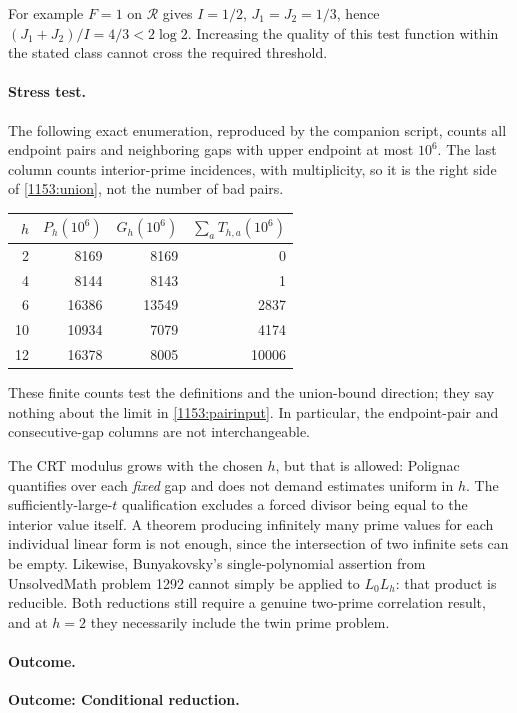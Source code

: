 \documentclass[11pt,a4paper]{article}
\numberwithin{equation}{section}
\begin{document}
For example $F=1$ on $\mathcal R$ gives $I=1/2$, $J_1=J_2=1/3$, hence
$(J_1+J_2)/I=4/3<2\log2$. Increasing the quality of this test function within
the stated class cannot cross the required threshold.

\paragraph{Stress test.}
The following exact enumeration, reproduced by the companion script, counts
all endpoint pairs and neighboring gaps with upper endpoint at most
$10^6$. The last column counts interior-prime incidences, with multiplicity,
so it is the right side of \eqref{1153:union}, not the number of bad pairs.
\begin{center}
\begin{tabular}{r|r|r|r}
$h$ & $P_h(10^6)$ & $G_h(10^6)$ & $\sum_a T_{h,a}(10^6)$\\\hline
2 & 8169 & 8169 & 0\\
4 & 8144 & 8143 & 1\\
6 & 16386 & 13549 & 2837\\
10 & 10934 & 7079 & 4174\\
12 & 16378 & 8005 & 10006
\end{tabular}
\end{center}
These finite counts test the definitions and the union-bound direction;
they say nothing about the limit in \eqref{1153:pairinput}. In particular,
the endpoint-pair and consecutive-gap columns are not interchangeable.

The CRT modulus grows with the chosen $h$, but that is allowed: Polignac
quantifies over each \emph{fixed} gap and does not demand estimates uniform
in $h$. The sufficiently-large-$t$ qualification excludes a forced divisor
being equal to the interior value itself. A theorem producing infinitely
many prime values for each individual linear form is not enough, since the
intersection of two infinite sets can be empty. Likewise, Bunyakovsky's
single-polynomial assertion from UnsolvedMath problem 1292 cannot simply be applied to
$L_0L_h$: that product is reducible. Both reductions still require a genuine
two-prime correlation result, and at $h=2$ they necessarily include the twin
prime problem.

\paragraph{Outcome.}
\textbf{Outcome: Conditional reduction.}
\end{document}

